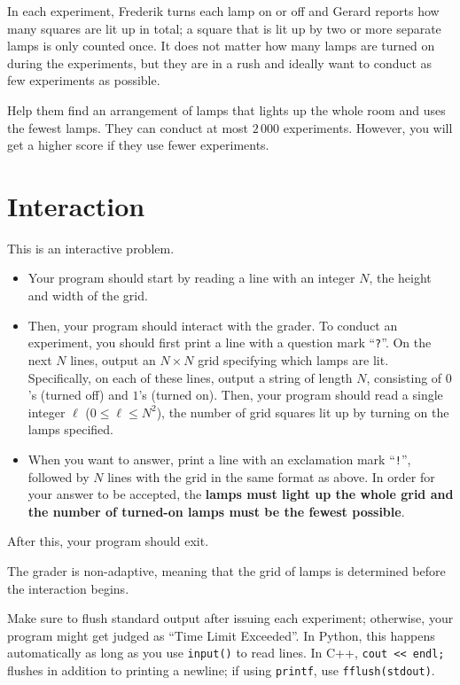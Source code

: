 In each experiment, Frederik turns each lamp on or off and Gerard reports how many squares are lit up in total; a square that is lit up by two or more separate lamps is only counted once.
It does not matter how many lamps are turned on during the experiments, but they are in a rush and ideally want to conduct as few experiments as possible.

Help them find an arrangement of lamps that lights up the whole room and uses the fewest lamps. They can conduct at most $2\,000$ experiments. However, you will get a higher score if they use fewer experiments.

\section*{Interaction}
This is an interactive problem.

\begin{itemize}
\item Your program should start by reading a line with an integer $N$, the height and width of the grid.
\item Then, your program should interact with the grader.
    To conduct an experiment, you should first print a line with a question mark ``\texttt{?}''.
On the next $N$ lines, output an $N \times N$ grid specifying which lamps are lit.
Specifically, on each of these lines, output a string of length $N$, consisting of $0$'s (turned off) and $1$'s (turned on).
Then, your program should read a single integer $\ell$ ($0 \leq \ell \leq N^2$), the number of grid squares lit up by turning on the lamps specified.
\item When you want to answer, print a line with an exclamation mark ``\texttt{!}'', followed by $N$ lines with the grid in the same format as above.
In order for your answer to be accepted, the \textbf{lamps must light up the whole grid and the number of turned-on lamps must be the fewest possible}.
\end{itemize}

After this, your program should exit.

The grader is non-adaptive, meaning that the grid of lamps is determined before the interaction begins.

Make sure to flush standard output after issuing each experiment; otherwise, your program might get judged as ``Time Limit Exceeded''.
In Python, this happens automatically as long as you use \texttt{input()} to read lines. In C++, \texttt{cout << endl;} flushes in addition to printing a newline; if using \texttt{printf}, use \texttt{fflush(stdout)}.

